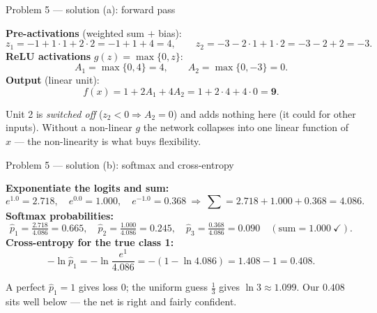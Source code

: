 \documentclass[aspectratio=169,11pt]{beamer}
\begin{document}
\begin{frame}{Problem 5 --- solution (a): forward pass}
  \begin{solutionbox}
    \textbf{Pre-activations} (weighted sum $+$ bias):
    \[
      z_1=-1+1\cdot1+2\cdot2=-1+1+4=4,\qquad
      z_2=-3-2\cdot1+1\cdot2=-3-2+2=-3 .
    \]
    \textbf{ReLU activations} $g(z)=\max\{0,z\}$:
    \[
      A_1=\max\{0,4\}=4,\qquad A_2=\max\{0,-3\}=0 .
    \]
    \textbf{Output} (linear unit):
    \[
      f(x)=1+2A_1+4A_2=1+2\cdot4+4\cdot0=\mathbf{9}.
    \]
  \end{solutionbox}
  \begin{takeaway}
    \footnotesize Unit 2 is \emph{switched off} ($z_2<0\Rightarrow A_2=0$) and adds nothing here
    (it could for other inputs). Without a non-linear $g$ the network collapses into one linear
    function of $x$ --- the non-linearity is what buys flexibility.
  \end{takeaway}
\end{frame}

\begin{frame}{Problem 5 --- solution (b): softmax and cross-entropy}
  \begin{solutionbox}
    \abovedisplayskip=4pt\belowdisplayskip=4pt\abovedisplayshortskip=2pt\belowdisplayshortskip=2pt
    \textbf{Exponentiate the logits and sum:}
    \[
      e^{1.0}=2.718,\quad e^{0.0}=1.000,\quad e^{-1.0}=0.368
      \ \Rightarrow\ \textstyle\sum=2.718+1.000+0.368=4.086 .
    \]
    \textbf{Softmax probabilities:}
    \[
      \hat p_1=\tfrac{2.718}{4.086}=\mathbf{0.665},\quad
      \hat p_2=\tfrac{1.000}{4.086}=\mathbf{0.245},\quad
      \hat p_3=\tfrac{0.368}{4.086}=\mathbf{0.090}
      \quad(\text{sum}=1.000\ \checkmark).
    \]
    \textbf{Cross-entropy for the true class 1:}
    \[
      -\ln\hat p_1=-\ln\frac{e^{1}}{4.086}=-(1-\ln4.086)=1.408-1=\mathbf{0.408}.
    \]
  \end{solutionbox}
  \begin{takeaway}
    \footnotesize A perfect $\hat p_1=1$ gives loss $0$; the uniform guess $\tfrac13$ gives
    $\ln3\approx1.099$. Our $0.408$ sits well below --- the net is right and fairly confident.
  \end{takeaway}
\end{frame}
\end{document}
